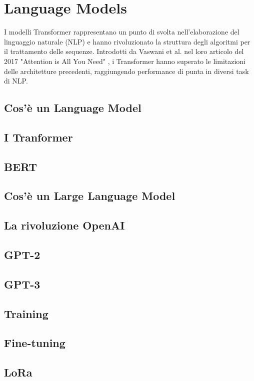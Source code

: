 \chapter{Language Models}\label{Language_Models}
I modelli Transformer rappresentano un punto di svolta nell'elaborazione del linguaggio naturale (NLP) e hanno rivoluzionato la struttura degli algoritmi per il trattamento delle sequenze. Introdotti da Vaswani et al. nel loro articolo del 2017 "Attention is All You Need" \cite{vaswani2023attention}, i Transformer hanno superato le limitazioni delle architetture precedenti, raggiungendo performance di punta in diversi task di NLP.
\section{Cos'è un Language Model}

\section{I Tranformer}

\section{BERT}

\section{Cos'è un Large Language Model}

\section{La rivoluzione OpenAI}

\section{GPT-2}

\section{GPT-3}

\section{Training}

\section{Fine-tuning}

\section{LoRa}
